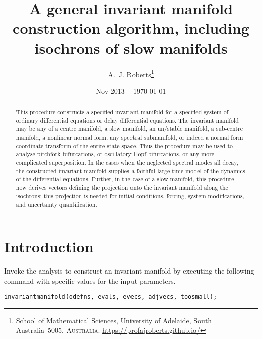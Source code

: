\documentclass[11pt,a5paper]{article}
\title{A general invariant manifold construction algorithm,
including isochrons of slow manifolds}
\author{A.~J. Roberts\thanks{School of Mathematical
Sciences, University of Adelaide, South Australia~5005,
\textsc{Australia}. \url{https://profajroberts.github.io/}}}
\date{Nov 2013 -- \today}
\begin{document}
\maketitle

\begin{abstract}
This procedure constructs a specified invariant manifold for a specified system of ordinary differential equations or delay differential equations. 
The invariant manifold may be any of a centre manifold, a slow manifold, an un/stable manifold, a sub-centre manifold, a nonlinear normal form, any spectral submanifold, or indeed a normal form coordinate transform of the entire state space.
Thus the procedure may be used to analyse pitchfork bifurcations, or oscillatory Hopf bifurcations, or any more complicated superposition. 
In the cases when the neglected spectral modes all decay, the constructed invariant manifold supplies a faithful large time model of the dynamics of the differential equations. 
Further, in the case of a slow manifold, this procedure now derives vectors defining the projection onto the invariant manifold along the isochrons: this projection is needed for initial conditions, forcing, system modifications, and uncertainty quantification.
\end{abstract}

\tableofcontents

\section{Introduction}

Invoke the analysis to construct an invariant manifold by executing the following command 
with specific values for the input parameters.
\begin{verbatim}
invariantmanifold(odefns, evals, evecs, adjvecs, toosmall);
\end{verbatim}
\end{document}
